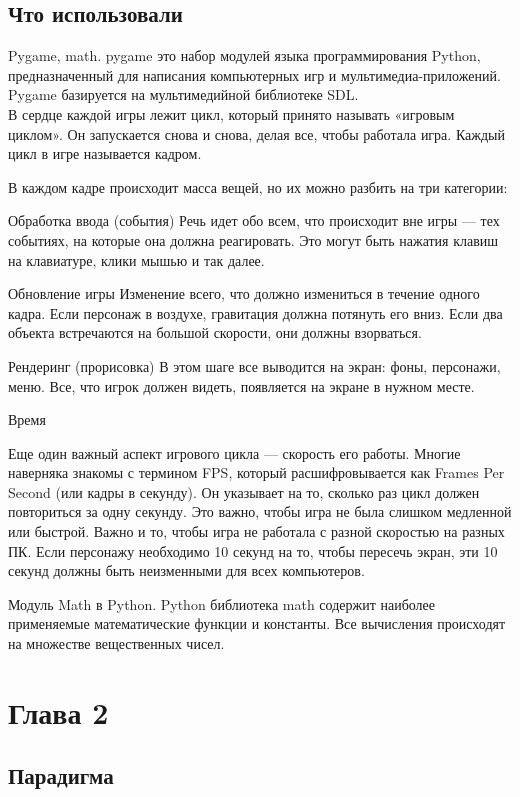 \documentclass[12pt,a4paper]{extarticle}
\begin{document}
\subsection{Что использовали}
Pygame, math. pygame это набор модулей языка программирования Python, предназначенный для написания компьютерных игр и мультимедиа-приложений. Pygame базируется на мультимедийной библиотеке SDL.\\
В сердце каждой игры лежит цикл, который принято называть «игровым циклом». Он запускается снова и снова, делая все, чтобы работала игра. Каждый цикл в игре называется кадром.

В каждом кадре происходит масса вещей, но их можно разбить на три категории:

Обработка ввода (события)
Речь идет обо всем, что происходит вне игры — тех событиях, на которые она должна реагировать. Это могут быть нажатия клавиш на клавиатуре, клики мышью и так далее.

Обновление игры
Изменение всего, что должно измениться в течение одного кадра. Если персонаж в воздухе, гравитация должна потянуть его вниз. Если два объекта встречаются на большой скорости, они должны взорваться.

Рендеринг (прорисовка)
В этом шаге все выводится на экран: фоны, персонажи, меню. Все, что игрок должен видеть, появляется на экране в нужном месте.

Время

Еще один важный аспект игрового цикла — скорость его работы. Многие наверняка знакомы с термином FPS, который расшифровывается как Frames Per Second (или кадры в секунду). Он указывает на то, сколько раз цикл должен повториться за одну секунду. Это важно, чтобы игра не была слишком медленной или быстрой. Важно и то, чтобы игра не работала с разной скоростью на разных ПК. Если персонажу необходимо 10 секунд на то, чтобы пересечь экран, эти 10 секунд должны быть неизменными для всех компьютеров.


Модуль Math в Python.
Python библиотека math содержит наиболее применяемые математические функции и константы. Все вычисления происходят на множестве вещественных чисел. 


\section{Глава 2}
\subsection{Парадигма}
\end{document}
